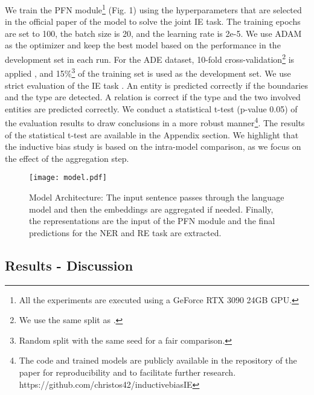 \documentclass[runningheads]{llncs}
\begin{document}
We train the PFN module\footnote{All the experiments are executed using a GeForce RTX 3090 24GB GPU.} (Fig. 1) using the hyperparameters that are selected in the official paper of the model \cite{yan-etal-2021-partition} to solve the joint IE task. The training epochs are set to 100, the batch size is 20, and the learning rate is 2e-5. We use ADAM \cite{kingma2014adam} as the optimizer and keep the best model based on the performance in the development set in each run. For the ADE dataset, 10-fold cross-validation\footnote{We use the same split as \cite{eberts2020span}.} is applied \cite{li2017neural,bekoulis2018joint,eberts2020span}, and 15\%\footnote{Random split with the same seed for a fair comparison.} of the training set is used as the development set. We use strict evaluation of the IE task \cite{bekoulis2018joint,taille2020let}. An entity is predicted correctly if the boundaries and the type are detected. A relation is correct if the type and the two involved entities are predicted correctly. We conduct a statistical t-test (p-value  0.05) of the evaluation results to draw conclusions in a more robust manner\footnote{The code and trained models are publicly available in the repository of the paper for reproducibility and to facilitate further research. https://github.com/christos42/inductive\textunderscore bias\textunderscore IE}. The results of the statistical t-test are available in the Appendix section. We highlight that the inductive bias study is based on the intra-model comparison, as we focus on the effect of the aggregation step. 

\begin{figure}[!h]
\vspace{-7mm}
  \centering
  \texttt{[image: model.pdf]}
   \vspace{-8mm}
   \caption{Model Architecture: The input sentence passes through the language model and then the embeddings are aggregated if needed. Finally, the representations are the input of the PFN module and the final predictions for the NER and RE task are extracted.}
   \vspace{-12mm}
\end{figure}


\subsection{Results - Discussion}
\end{document}
